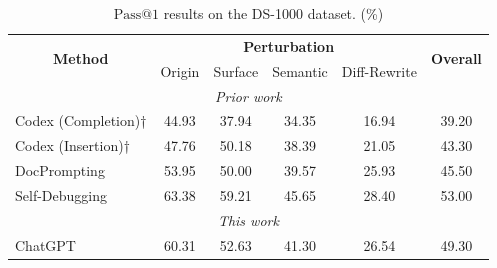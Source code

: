 \documentclass[a4paper,oneside]{book}
\begin{document}
\begin{table}[H]
  \caption{$\text{Pass@1}$ results on the DS-1000 dataset. (\%)}\label{tab:ds1000_results}
  \begin{center}
    \begin{tabular}{|lccccc|}
      \hline
      \multicolumn{1}{|c|}{\multirow{2}{*}{\textbf{Method}}} & \multicolumn{4}{c|}{\textbf{Perturbation}} & \multirow{2}{*}{\textbf{Overall}}                                                                                                \\ \cline{2-5}
      \multicolumn{1}{|c|}{}                                 & \multicolumn{1}{l|}{Origin}                & \multicolumn{1}{l|}{Surface}        & \multicolumn{1}{l|}{Semantic}       & \multicolumn{1}{l|}{Diff-Rewrite}   &                \\ \hline
      \multicolumn{6}{|c|}{\textit{Prior work}}                                                                                                                                                                                              \\ \hline
      \multicolumn{1}{|l|}{Codex (Completion)†}              & \multicolumn{1}{c|}{44.93}                 & \multicolumn{1}{c|}{37.94}          & \multicolumn{1}{c|}{34.35}          & \multicolumn{1}{c|}{16.94}          & 39.20          \\ \hline
      \multicolumn{1}{|l|}{Codex (Insertion)†}               & \multicolumn{1}{c|}{47.76}                 & \multicolumn{1}{c|}{50.18}          & \multicolumn{1}{c|}{38.39}          & \multicolumn{1}{c|}{21.05}          & 43.30          \\ \hline
      \multicolumn{1}{|l|}{DocPrompting}                     & \multicolumn{1}{c|}{53.95}                 & \multicolumn{1}{c|}{50.00}          & \multicolumn{1}{c|}{39.57}          & \multicolumn{1}{c|}{25.93}          & 45.50          \\ \hline
      \multicolumn{1}{|l|}{Self-Debugging}                   & \multicolumn{1}{c|}{63.38}                 & \multicolumn{1}{c|}{59.21}          & \multicolumn{1}{c|}{45.65}          & \multicolumn{1}{c|}{28.40}          & 53.00          \\ \hline
      \multicolumn{6}{|c|}{\textit{This work}}                                                                                                                                                                                               \\ \hline
      \multicolumn{1}{|l|}{ChatGPT}                          & \multicolumn{1}{c|}{60.31}                 & \multicolumn{1}{c|}{52.63}          & \multicolumn{1}{c|}{41.30}          & \multicolumn{1}{c|}{26.54}          & 49.30          \\ \hline

\end{tabular}
\end{center}
\end{table}
\end{document}
